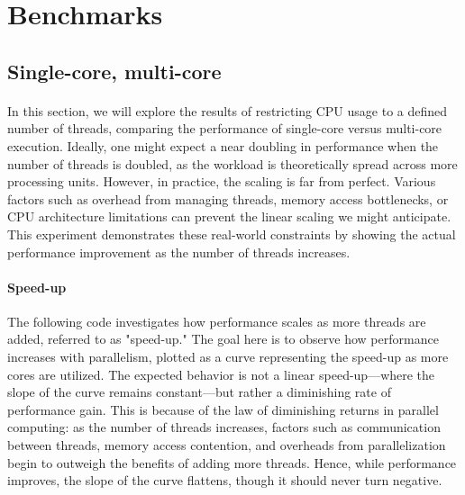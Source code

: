 \section{Benchmarks}

\subsection{Single-core, multi-core}

    \paragraph*{}
    In this section, we will explore the results of restricting CPU usage to a defined number of threads, comparing 
    the performance of single-core versus multi-core execution. Ideally, one might expect a near doubling in performance 
    when the number of threads is doubled, as the workload is theoretically spread across more processing units. However, 
    in practice, the scaling is far from perfect. Various factors such as overhead from managing threads, memory access 
    bottlenecks, or CPU architecture limitations can prevent the linear scaling we might anticipate. This experiment 
    demonstrates these real-world constraints by showing the actual performance improvement as the number of threads increases.
    \par

    \vspace*{0.5cm}

    

    \begin{figure}[h]
        \begin{center}
            
        \end{center}
        \caption{}
        \label{}
    \end{figure}


    \paragraph*{Speed-up} The following code investigates how performance scales as more threads are added, 
    referred to as "speed-up." The goal here is to observe how performance increases with parallelism, plotted as 
    a curve representing the speed-up as more cores are utilized. The expected behavior is not a linear speed-up—where the 
    slope of the curve remains constant—but rather a diminishing rate of performance gain. This is because of the law of 
    diminishing returns in parallel computing: as the number of threads increases, factors such as communication between 
    threads, memory access contention, and overheads from parallelization begin to outweigh the benefits of adding more 
    threads. Hence, while performance improves, the slope of the curve flattens, though it should never turn negative.
    \par

